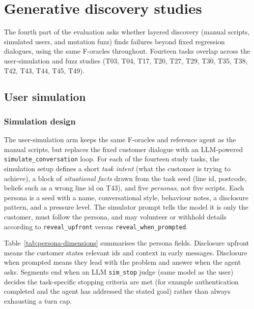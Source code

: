 \section{Generative discovery studies}
\label{sec:generative-studies}

The fourth part of the evaluation asks whether layered discovery (manual scripts, simulated users, and mutation fuzz) finds failures beyond fixed regression dialogues, using the same F-oracles throughout. Fourteen tasks overlap across the user-simulation and fuzz studies (T03, T04, T17, T20, T27, T29, T30, T35, T38, T42, T43, T44, T45, T49).

\subsection{User simulation}

\subsubsection{Simulation design}

The user-simulation arm keeps the same F-oracles and reference agent as the manual scripts, but replaces the fixed customer dialogue with an LLM-powered \texttt{simulate\_conversation} loop. For each of the fourteen study tasks, the simulation setup defines a short \emph{task intent} (what the customer is trying to achieve), a block of \emph{situational facts} drawn from the task seed (line id, postcode, beliefs such as a wrong line id on T43), and five \emph{personas}, not five scripts. Each persona is a seed with a name, conversational style, behaviour notes, a disclosure pattern, and a pressure level. The simulator prompt tells the model it is only the customer, must follow the persona, and may volunteer or withhold details according to \texttt{reveal\_upfront} versus \texttt{reveal\_when\_prompted}.

Table~\ref{tab:persona-dimensions} summarises the persona fields. Disclosure upfront means the customer states relevant ids and context in early messages. Disclosure when prompted means they lead with the problem and answer when the agent asks. Segments end when an LLM \texttt{sim\_stop} judge (same model as the user) decides the task-specific stopping criteria are met (for example authentication completed and the agent has addressed the stated goal) rather than always exhausting a turn cap.


